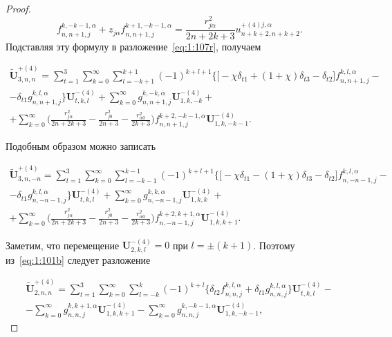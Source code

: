 \begin{proof}
\begin{equation*}
{f}_{n,n+1,j}^{k,-k-1,\alpha}+z_{j\alpha}{f}_{n,n+1,j}^{k+1,-k-1,\alpha}=\frac{r_{j\alpha}^2}{2n+2k+3}u_{n+k+2,n+k+2}^{+(4)j,\alpha}.
\end{equation*}
Подставляя эту формулу в разложение~\eqref{eq:1:107r}, получаем

\begin{multline}
\mathbf{\tilde U}_{3,n,n}^{+(4)}=\sum\limits_{t=1}^3\sum\limits_{k=0}^\infty\sum\limits_{l=-k+1}^{k+1}(-1)^{k+l+1}\bigg\{\bigg\lbrack-\chi\delta_{t1}+(1+\chi)\delta_{t3}-\delta_{t2}
\bigg\rbrack{f}_{n,n+1,j}^{k,l,\alpha}- \\
-\delta_{t1}{g}_{n,n+1,j}^{k,l,\alpha}\bigg\}\mathbf{U}_{t,k,l}^{-(4)}+\sum\limits_{k=0}^\infty{g}_{n,n+1,j}^{k,-k,\alpha}\mathbf{U}_{1,k,-k}^{-(4)}+ \\
+\sum\limits_{k=0}^\infty
\bigg(\frac{r_{j\alpha}^2}{2n+2k+3}-\frac{r_{j0}^2}{2n+3}-\frac{r_{\alpha 0}^2}{2k+3}\bigg){f}_{n,n+1,j}^{k+2,-k-1,\alpha}\mathbf{U}_{1,k,-k-1}^{-(4)}.
\label{eq:1:109r}
\end{multline}

Подобным образом можно записать

\begin{multline}
\mathbf{\tilde U}_{3,n,-n}^{+(4)}=\sum\limits_{t=1}^3\sum\limits_{k=0}^\infty\sum\limits_{l=-k-1}^{k-1}(-1)^{k+l+1}\bigg\{\bigg\lbrack-\chi\delta_{t1}-(1+\chi)\delta_{t3}-\delta_{t2}
\bigg\rbrack{f}_{n,-n-1,j}^{k,l,\alpha}- \\
-\delta_{t1}{g}_{n,-n-1,j}^{k,l,\alpha}\bigg\}\mathbf{U}_{t,k,l}^{-(4)}+\sum\limits_{k=0}^\infty{g}_{n,-n-1,j}^{k,k,\alpha}\mathbf{U}_{1,k,k}^{-(4)}+ \\
+\sum\limits_{k=0}^\infty
\bigg(\frac{r_{j\alpha}^2}{2n+2k+3}-\frac{r_{j0}^2}{2n+3}-\frac{r_{\alpha 0}^2}{2k+3}\bigg){f}_{n,-n-1,j}^{k+2,k+1,\alpha}\mathbf{U}_{1,k,k+1}^{-(4)}.
\label{eq:1:110r}
\end{multline}

Заметим, что перемещение $\mathbf{U}_{2,k,l}^{-(4)}=0$ при $l=\pm(k+1)$. Поэтому из~\eqref{eq:1:101b} следует разложение

\begin{multline}
\mathbf{\tilde U}_{2,n,n}^{+(4)}=\sum\limits_{t=1}^3\sum\limits_{k=0}^\infty\sum\limits_{l=-k}^{k}(-1)^{k+l}\bigg\{\delta_{t2}{f}_{n,n,j}^{k,l,\alpha}+\delta_{t1}{g}_{n,n,j}^{k,l,\alpha}\bigg\}\mathbf{U}_{t,k,l}^{-(4)}- \\
-\sum\limits_{k=0}^\infty{g}_{n,n,j}^{k,k+1,\alpha}\mathbf{U}_{1,k,k+1}^{-(4)}-\sum\limits_{k=0}^\infty{g}_{n,n,j}^{k,-k-1,\alpha}\mathbf{U}_{1,k,-k-1}^{-(4)},
\label{eq:1:112r}
\end{multline}


\end{proof}
